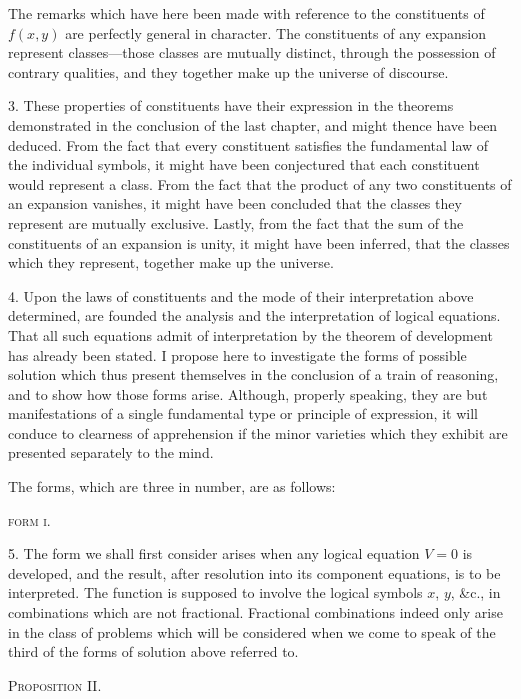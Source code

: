 \documentclass[oneside]{book}
\begin{document}
The remarks which have here been made with reference to the
constituents of $f\left(x,y\right)$ are perfectly general in character. The
constituents of any expansion represent classes---those classes
are mutually distinct, through the possession of contrary qualities,
and they together make up the universe of discourse.

3. These properties of constituents have their expression in
the theorems demonstrated in the conclusion of the last chapter,
and might thence have been deduced. From the fact that every
constituent satisfies the fundamental law of the individual symbols,
it might have been conjectured that each constituent would
represent a class. From the fact that the product of any two
constituents of an expansion vanishes, it might have been concluded
that the classes they represent are mutually exclusive.
Lastly, from the fact that the sum of the constituents of an expansion
is unity, it might have been inferred, that the classes
which they represent, together make up the universe.

4. Upon the laws of constituents and the mode of their interpretation
above determined, are founded the analysis and the
interpretation of logical equations. That all such equations admit
of interpretation by the theorem of development has already
been stated. I propose here to investigate the forms of possible
solution which thus present themselves in the conclusion of a
train of reasoning, and to show how those forms arise. Although,
properly speaking, they are but manifestations of a single fundamental
type or principle of expression, it will conduce to clearness
of apprehension if the minor varieties which they exhibit are
presented separately to the mind.

The forms, which are three in number, are as follows:

\begin{center}
\textsc{form i}.
\end{center}

5. The form we shall first consider arises when any logical
equation $V=0$ is developed, and the result, after resolution into
its component equations, is to be interpreted. The function is supposed
to involve the logical symbols $x$, $y$, \&c., in combinations which
are not fractional. Fractional combinations indeed only arise in
the class of problems which will be considered when we come to
speak of the third of the forms of solution above referred to.

\begin{center}
\textsc{Proposition II.}
\end{center}
\end{document}
